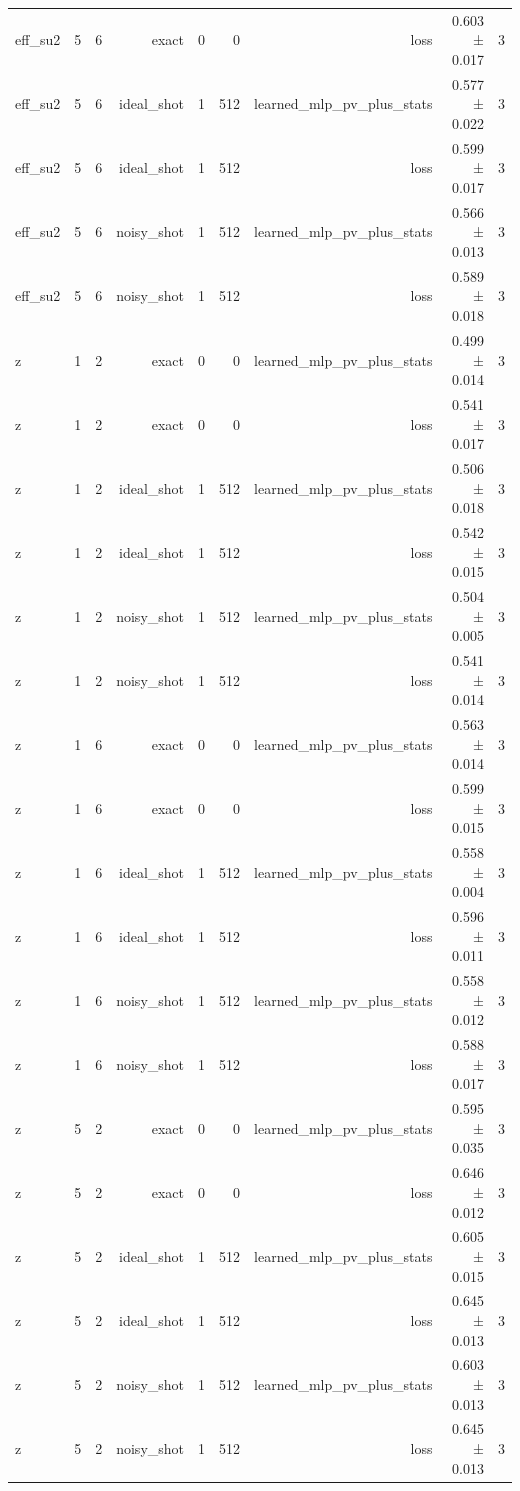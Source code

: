\begin{table}
\begin{tabular}{lrrrrrrrr}
eff\_su2 & 5 & 6 & exact & 0 & 0 & loss & 0.603 ± 0.017 & 3 \\
eff\_su2 & 5 & 6 & ideal\_shot & 1 & 512 & learned\_mlp\_pv\_plus\_stats & 0.577 ± 0.022 & 3 \\
eff\_su2 & 5 & 6 & ideal\_shot & 1 & 512 & loss & 0.599 ± 0.017 & 3 \\
eff\_su2 & 5 & 6 & noisy\_shot & 1 & 512 & learned\_mlp\_pv\_plus\_stats & 0.566 ± 0.013 & 3 \\
eff\_su2 & 5 & 6 & noisy\_shot & 1 & 512 & loss & 0.589 ± 0.018 & 3 \\
z & 1 & 2 & exact & 0 & 0 & learned\_mlp\_pv\_plus\_stats & 0.499 ± 0.014 & 3 \\
z & 1 & 2 & exact & 0 & 0 & loss & 0.541 ± 0.017 & 3 \\
z & 1 & 2 & ideal\_shot & 1 & 512 & learned\_mlp\_pv\_plus\_stats & 0.506 ± 0.018 & 3 \\
z & 1 & 2 & ideal\_shot & 1 & 512 & loss & 0.542 ± 0.015 & 3 \\
z & 1 & 2 & noisy\_shot & 1 & 512 & learned\_mlp\_pv\_plus\_stats & 0.504 ± 0.005 & 3 \\
z & 1 & 2 & noisy\_shot & 1 & 512 & loss & 0.541 ± 0.014 & 3 \\
z & 1 & 6 & exact & 0 & 0 & learned\_mlp\_pv\_plus\_stats & 0.563 ± 0.014 & 3 \\
z & 1 & 6 & exact & 0 & 0 & loss & 0.599 ± 0.015 & 3 \\
z & 1 & 6 & ideal\_shot & 1 & 512 & learned\_mlp\_pv\_plus\_stats & 0.558 ± 0.004 & 3 \\
z & 1 & 6 & ideal\_shot & 1 & 512 & loss & 0.596 ± 0.011 & 3 \\
z & 1 & 6 & noisy\_shot & 1 & 512 & learned\_mlp\_pv\_plus\_stats & 0.558 ± 0.012 & 3 \\
z & 1 & 6 & noisy\_shot & 1 & 512 & loss & 0.588 ± 0.017 & 3 \\
z & 5 & 2 & exact & 0 & 0 & learned\_mlp\_pv\_plus\_stats & 0.595 ± 0.035 & 3 \\
z & 5 & 2 & exact & 0 & 0 & loss & 0.646 ± 0.012 & 3 \\
z & 5 & 2 & ideal\_shot & 1 & 512 & learned\_mlp\_pv\_plus\_stats & 0.605 ± 0.015 & 3 \\
z & 5 & 2 & ideal\_shot & 1 & 512 & loss & 0.645 ± 0.013 & 3 \\
z & 5 & 2 & noisy\_shot & 1 & 512 & learned\_mlp\_pv\_plus\_stats & 0.603 ± 0.013 & 3 \\
z & 5 & 2 & noisy\_shot & 1 & 512 & loss & 0.645 ± 0.013 & 3 \\

\end{tabular}
\end{table}
